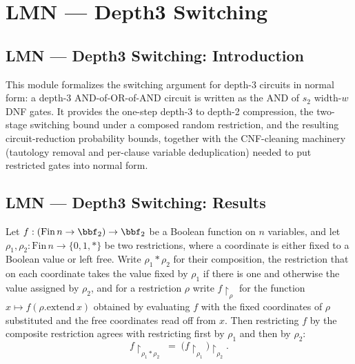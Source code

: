 \section{LMN --- Depth3 Switching}
\subsection*{LMN --- Depth3 Switching: Introduction}

This module formalizes the switching argument for depth-3 circuits in normal form: a
depth-3 AND-of-OR-of-AND circuit is written as the AND of $s_2$ width-$w$ DNF gates.
It provides the one-step depth-3 to depth-2 compression, the two-stage switching bound
under a composed random restriction, and the resulting circuit-reduction probability
bounds, together with the CNF-cleaning machinery (tautology removal and per-clause
variable deduplication) needed to put restricted gates into normal form.

\subsection*{LMN --- Depth3 Switching: Results}

\begin{theorem}
\label{LMN.restrictFn_composeRestr}
\leanok
{}
Let $f : (\mathrm{Fin}\,n \to \bbf_2) \to \bbf_2$ be a Boolean function on $n$
variables, and let $\rho_1, \rho_2 : \mathrm{Fin}\,n \to \{0, 1, *\}$ be two
restrictions, where a coordinate is either fixed to a Boolean value or left free. Write
$\rho_1 * \rho_2$ for their composition, the restriction that on each coordinate takes
the value fixed by $\rho_1$ if there is one and otherwise the value assigned by
$\rho_2$, and for a restriction $\rho$ write $f\!\restriction_\rho$ for the function $x
\mapsto f(\rho.\mathrm{extend}\,x)$ obtained by evaluating $f$ with the fixed
coordinates of $\rho$ substituted and the free coordinates read off from $x$. Then
restricting $f$ by the composite restriction agrees with restricting first by $\rho_1$
and then by $\rho_2$:
\[
f\!\restriction_{\rho_1 * \rho_2} \;=\;
\bigl(f\!\restriction_{\rho_1}\bigr)\!\restriction_{\rho_2}.
\]
\end{theorem}

